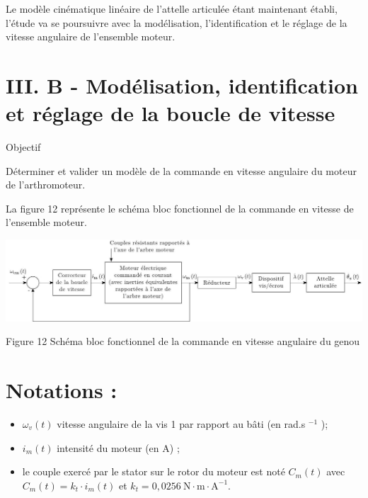 \documentclass[10pt]{article}
\begin{document}
Le modèle cinématique linéaire de l'attelle articulée étant maintenant établi, l'étude va se poursuivre avec la modélisation, l'identification et le réglage de la vitesse angulaire de l'ensemble moteur.

\section*{III. B - Modélisation, identification et réglage de la boucle de vitesse}
Objectif

Déterminer et valider un modèle de la commande en vitesse angulaire du moteur de l'arthromoteur.

La figure 12 représente le schéma bloc fonctionnel de la commande en vitesse de l'ensemble moteur.

\begin{center}
\includegraphics[max width=\textwidth]{2024_07_14_a83aebba33898893d39fg-08}
\end{center}

Figure 12 Schéma bloc fonctionnel de la commande en vitesse angulaire du genou

\section*{Notations :}
\begin{itemize}
  \item $\omega_{v}(t)$ vitesse angulaire de la vis 1 par rapport au bâti (en rad.s ${ }^{-1}$ );

  \item $i_{m}(t)$ intensité du moteur (en A) ;

  \item le couple exercé par le stator sur le rotor du moteur est noté $C_{m}(t)$ avec $C_{m}(t)=k_{t} \cdot i_{m}(t)$ et $k_{t}=0,0256 \mathrm{~N} \cdot \mathrm{m} \cdot \mathrm{A}^{-1}$.

\end{itemize}
\end{document}
